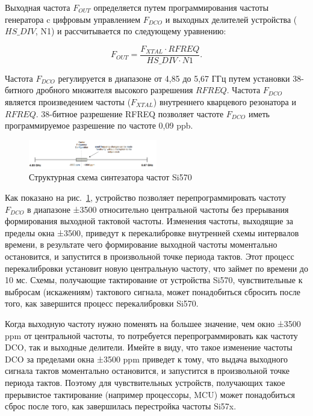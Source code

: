 Выходная частота \(F_{OUT}\) определяется путем программирования частоты генератора c цифровым управлением \(F_{DCO}\) и выходных делителей устройства (\(HS\_DIV\), N1) и рассчитывается по следующему уравнению:

\begin{equation}	
	F_{OUT} = \frac{F_{XTAL} \cdot RFREQ}{HS\_DIV \cdot N1}.
\end{equation}

Частота \(F_{DCO}\) регулируется в диапазоне от 4,85 до 5,67 ГГц путем установки 38-битного дробного множителя высокого разрешения \(RFREQ\). Частота \(F_{DCO}\) является произведением частоты (\(F_{XTAL}\)) внутреннего кварцевого резонатора и \(RFREQ\). 38-битное разрешение RFREQ позволяет частоте \(F_{DCO}\) иметь программируемое разрешение по частоте 0,09 ppb.

\begin{figure}[h]
	\centering
	\includegraphics[width=0.5\textwidth]{image/si570_0.png}
	\caption{Структурная схема синтезатора частот Si570}
	\label{si570_0.PNG}
\end{figure}

Как показано на рис.~\ref{si570_0.PNG}, устройство позволяет перепрограммировать частоту \(F_{DCO}\) в диапазоне ±3500 относительно центральной частоты без прерывания формирования выходной тактовой частоты. Изменения частоты, выходящие за пределы окна ±3500, приведут к перекалибровке внутренней схемы интервалов времени, в результате чего формирование выходной частоты моментально остановится, и запустится в произвольной точке периода тактов. Этот процесс перекалибровки установит новую центральную частоту, что займет по времени до 10 мс. Схемы, получающие тактирование от устройства Si570, чувствительные к выбросам (искажениям) тактового сигнала, может понадобиться сбросить после того, как завершится процесс перекалибровки Si570.

Когда выходную частоту нужно поменять на большее значение, чем окно ±3500 ppm от центральной частоты, то потребуется перепрограммировать как частоту DCO, так и выходные делители. Имейте в виду, что такое изменение частоты DCO за пределами окна ±3500 ppm приведет к тому, что выдача выходного сигнала тактов моментально остановится, и запустится в произвольной точке периода тактов. Поэтому для чувствительных устройств, получающих такое прерывистое тактирование (например процессоры, MCU) может понадобиться сброс после того, как завершилась перестройка частоты Si57x.


